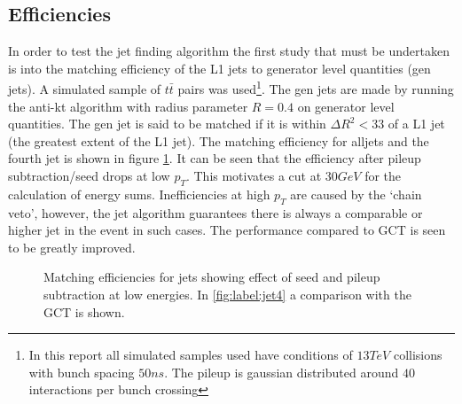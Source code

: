 \subsection{Efficiencies}
In order to test the jet finding algorithm the first study that must be undertaken is into the matching efficiency of the L1 jets to generator level quantities (gen jets). A simulated sample of $t\bar{t}$ pairs was used\footnote{In this report all simulated samples used have conditions of $13TeV$ collisions with bunch spacing $50ns$. The pileup is gaussian distributed around $40$ interactions per bunch crossing}. The gen jets are made by running the anti-kt algorithm with radius parameter $R=0.4$ on generator level quantities. The gen jet is said to be matched if it is within ${\Delta R}^2<33$ of a L1 jet (the greatest extent of the L1 jet). The matching efficiency for alljets and the fourth jet is shown in figure \ref{match}. It can be seen that the efficiency after pileup subtraction/seed drops at low $p_T$. This motivates a cut at $30GeV$ for the calculation of energy sums. Inefficiencies at high $p_T$ are caused by the `chain veto', however, the jet algorithm guarantees there is always a comparable or higher jet in the event in such cases. The performance compared to GCT is seen to be greatly improved.  
\begin{figure}
\hfill
{}
\hfill
{}
\hfill
\caption{Matching efficiencies for jets showing effect of seed and pileup subtraction at low energies. In \ref{fig:label:jet4} a comparison with the GCT is shown.}
\label{match}
\end{figure}
